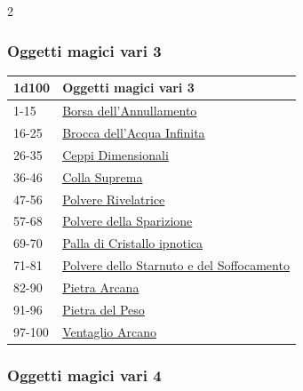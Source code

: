 \begin{multicols}{2}
{\subsubsection{Oggetti magici vari 3}\hypertarget{Oggetti Magici Vari 3}{}

{\small\begin{tabularx}{\linewidth}{ll}
		\toprule
\rowcolor{gray!20}\textbf{1d100} & \textbf{Oggetti magici vari 3}\\
\toprule
1-15 & \hyperlink{Borsa dell'Annullamento}{Borsa dell'Annullamento}\\
\rowcolor{gray!20}16-25 & \hyperlink{Brocca dell'Acqua Infinita}{Brocca dell'Acqua Infinita}\\
26-35 & \hyperlink{Ceppi Dimensionali}{Ceppi Dimensionali}\\
\rowcolor{gray!20}36-46 & \hyperlink{Colla Suprema}{Colla Suprema}\\
47-56 & \hyperlink{Polvere Rivelatrice}{Polvere Rivelatrice}\\
\rowcolor{gray!20}57-68 & \hyperlink{Polvere della Sparizione}{Polvere della Sparizione}\\
69-70 & \hyperlink{Palla di Cristallo ipnotica}{Palla di Cristallo ipnotica}\\
\rowcolor{gray!20}71-81 & \hyperlink{Polvere dello Starnuto e del Soffocamento}{Polvere dello Starnuto e del Soffocamento}\\
82-90 & \hyperlink{Pietra Arcana}{Pietra Arcana}\\
\rowcolor{gray!20}91-96 & \hyperlink{Pietra del Peso}{Pietra del Peso}\\
97-100 & \hyperlink{Ventaglio Arcano}{Ventaglio Arcano}
\end{tabularx}}


\subsubsection{Oggetti magici vari 4}\hypertarget{Oggetti Magici Vari 4}{}

}
\end{multicols}
